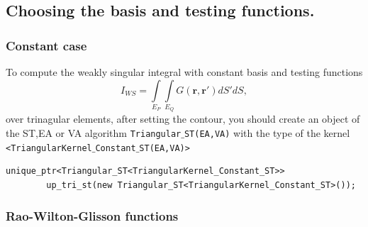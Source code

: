 \documentclass[a4wide,11pt]{article}
\renewcommand{\[}{\begin{equation}}
\renewcommand{\]}{\end{equation}}
\renewcommand{\{}{\begin{eqnarray}}
\renewcommand{\}}{\end{eqnarray}}
\renewcommand{\vec}{\mathbf}
\begin{document}
\subsection{Choosing the basis and testing functions.}
\subsubsection*{Constant case}
To compute the weakly singular integral with constant basis and testing functions
\[
\label{I_const_tri}
I_{WS} = \int\limits_{E_P}\int\limits_{E_Q} G(\vec r, \vec r') dS' dS,
\] 
over trinagular elements, after setting the contour, you should create an object of the ST,EA or VA algorithm \texttt{Triangular$\_$ST(EA,VA)} with the type of the kernel \texttt{<TriangularKernel$\_$Constant$\_$ST(EA,VA)>}
\begin{verbatim}
unique_ptr<Triangular_ST<TriangularKernel_Constant_ST>> 
        up_tri_st(new Triangular_ST<TriangularKernel_Constant_ST>());
\end{verbatim}

\subsubsection*{Rao-Wilton-Glisson functions}
\end{document}
